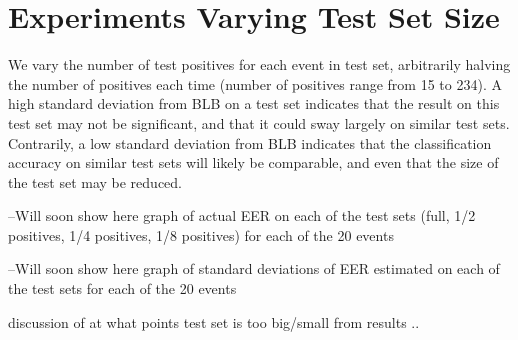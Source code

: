 \section{Experiments Varying Test Set Size}

We vary the number of test positives for each event in test set, arbitrarily halving the number of positives each time (number of positives range from 15 to 234). 
A high standard deviation from BLB on a test set indicates that the result on this test set may not be significant, and that it could sway largely on similar test sets. 
Contrarily, a low standard deviation from BLB indicates that the classification accuracy on similar test sets will likely be comparable, and even that the size of the test set may be reduced. 



--Will soon show here graph of actual EER on each of the test sets (full, 1/2 positives, 1/4 positives, 1/8 positives) for each of the 20 events

--Will soon show here graph of standard deviations of EER estimated on each of the test sets for each of the 20 events

discussion of at what points test set is too big/small from results ..